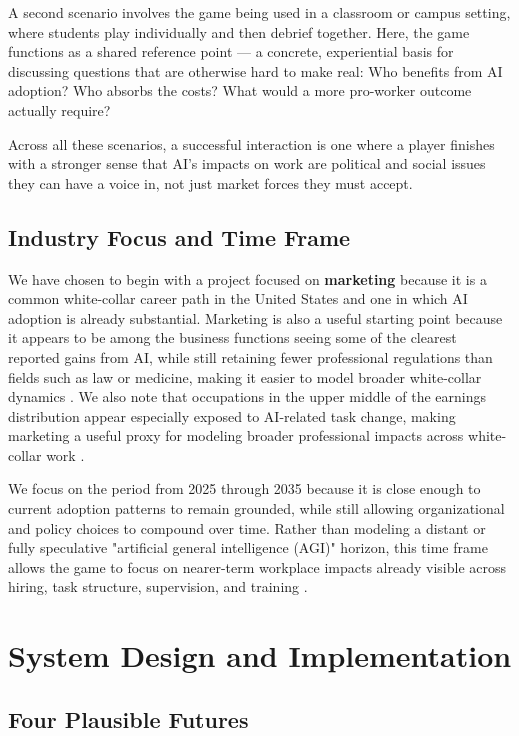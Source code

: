 \documentclass[sigconf,authordraft]{acmart}
\begin{document}
A second scenario involves the game being used in a classroom or campus setting, where students play individually and then debrief together. Here, the game functions as a shared reference point — a concrete, experiential basis for discussing questions that are otherwise hard to make real: Who benefits from AI adoption? Who absorbs the costs? What would a more pro-worker outcome actually require?

Across all these scenarios, a successful interaction is one where a player finishes with a stronger sense that AI's  impacts on work are political and social issues they can have a voice in, not just market forces they must accept.


\subsection{Industry Focus and Time Frame}

We have chosen to begin with a project focused on \textbf{marketing} because it is a common white-collar career path in the United States and one in which AI adoption is already substantial. Marketing is also a useful starting point because it appears to be among the business functions seeing some of the clearest reported gains from AI, while still retaining fewer professional regulations than fields such as law or medicine, making it easier to model broader white-collar dynamics \cite{mckinsey2025state}. We also note that occupations in the upper middle of the earnings distribution appear especially exposed to AI-related task change, making marketing a useful proxy for modeling broader professional impacts across white-collar work \cite{acemoglu2026building}.

We focus on the period from 2025 through 2035 because it is close enough to current adoption patterns to remain grounded, while still allowing organizational and policy choices to compound over time. Rather than modeling a distant or fully speculative "artificial general intelligence (AGI)" horizon, this time frame allows the game to focus on nearer-term workplace impacts already visible across hiring, task structure, supervision, and training \cite{oecd2023employment, eloundou2024gpts}.


\section{System Design and Implementation}

\subsection{Four Plausible Futures}
\end{document}
